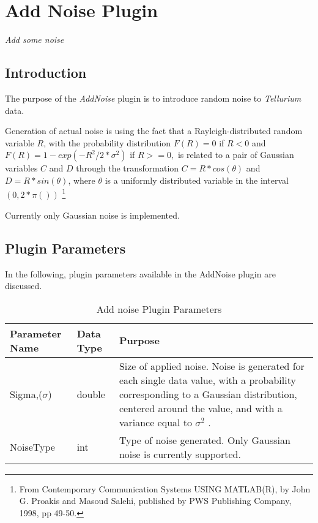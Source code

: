 \chapter{Add Noise Plugin}
\emph{Add some noise}
\section{Introduction}
The purpose of the \emph{AddNoise} plugin is to introduce random noise to \emph{Tellurium} data. 

Generation of actual noise is using the fact that a Rayleigh-distributed random variable $R$, with
the probability distribution $F(R) = 0$ if $R < 0$ and $F(R) = 1 - exp(-R^2/2*\sigma^2)$ if $R >= 0, $
is related to a pair of Gaussian variables $C$ and $D$ through the transformation $C = R * cos(\theta)$ and
$D = R * sin(\theta)$, where $\theta$ is a uniformly distributed variable
in the interval $(0, 2*\pi())$ \footnote{From Contemporary Communication Systems
USING MATLAB(R), by John G. Proakis and Masoud Salehi, published by
PWS Publishing Company, 1998, pp 49-50.} 

Currently only Gaussian noise is implemented. 

 
\section{Plugin Parameters}
In the following, plugin parameters available in the AddNoise plugin are discussed.

\begin{table}[ht]
\centering %
\begin{tabular}{l l p{7.5cm}} %

Parameter Name & Data Type & Purpose \\ [0.5ex] %
\hline %
Sigma,($\sigma$)         	& 	double & Size of applied noise. Noise is generated for each single data value, with a probability corresponding to a Gaussian distribution, centered around the value, and with a variance equal to $\sigma^2$ .\\
NoiseType      	& 	int    & Type of noise generated. Only Gaussian noise is currently supported. \\

\hline %
\end{tabular}
\caption{Add noise Plugin Parameters} 
\label{table:AddNoisePluginParameters} 
\end{table}

